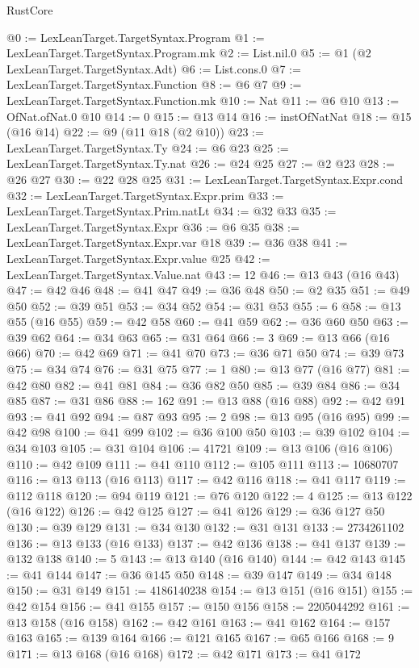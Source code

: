 \begin{lexlean}{RustCore}
\begin{coremodule}
@0 := LexLeanTarget.TargetSyntax.Program
@1 := LexLeanTarget.TargetSyntax.Program.mk
@2 := List.nil.{0}
@5 := @1 (@2 LexLeanTarget.TargetSyntax.Adt)
@6 := List.cons.{0}
@7 := LexLeanTarget.TargetSyntax.Function
@8 := @6 @7
@9 := LexLeanTarget.TargetSyntax.Function.mk
@10 := Nat
@11 := @6 @10
@13 := OfNat.ofNat.{0} @10
@14 := 0
@15 := @13 @14
@16 := instOfNatNat
@18 := @15 (@16 @14)
@22 := @9 (@11 @18 (@2 @10))
@23 := LexLeanTarget.TargetSyntax.Ty
@24 := @6 @23
@25 := LexLeanTarget.TargetSyntax.Ty.nat
@26 := @24 @25
@27 := @2 @23
@28 := @26 @27
@30 := @22 @28 @25
@31 := LexLeanTarget.TargetSyntax.Expr.cond
@32 := LexLeanTarget.TargetSyntax.Expr.prim
@33 := LexLeanTarget.TargetSyntax.Prim.natLt
@34 := @32 @33
@35 := LexLeanTarget.TargetSyntax.Expr
@36 := @6 @35
@38 := LexLeanTarget.TargetSyntax.Expr.var @18
@39 := @36 @38
@41 := LexLeanTarget.TargetSyntax.Expr.value @25
@42 := LexLeanTarget.TargetSyntax.Value.nat
@43 := 12
@46 := @13 @43 (@16 @43)
@47 := @42 @46
@48 := @41 @47
@49 := @36 @48
@50 := @2 @35
@51 := @49 @50
@52 := @39 @51
@53 := @34 @52
@54 := @31 @53
@55 := 6
@58 := @13 @55 (@16 @55)
@59 := @42 @58
@60 := @41 @59
@62 := @36 @60 @50
@63 := @39 @62
@64 := @34 @63
@65 := @31 @64
@66 := 3
@69 := @13 @66 (@16 @66)
@70 := @42 @69
@71 := @41 @70
@73 := @36 @71 @50
@74 := @39 @73
@75 := @34 @74
@76 := @31 @75
@77 := 1
@80 := @13 @77 (@16 @77)
@81 := @42 @80
@82 := @41 @81
@84 := @36 @82 @50
@85 := @39 @84
@86 := @34 @85
@87 := @31 @86
@88 := 162
@91 := @13 @88 (@16 @88)
@92 := @42 @91
@93 := @41 @92
@94 := @87 @93
@95 := 2
@98 := @13 @95 (@16 @95)
@99 := @42 @98
@100 := @41 @99
@102 := @36 @100 @50
@103 := @39 @102
@104 := @34 @103
@105 := @31 @104
@106 := 41721
@109 := @13 @106 (@16 @106)
@110 := @42 @109
@111 := @41 @110
@112 := @105 @111
@113 := 10680707
@116 := @13 @113 (@16 @113)
@117 := @42 @116
@118 := @41 @117
@119 := @112 @118
@120 := @94 @119
@121 := @76 @120
@122 := 4
@125 := @13 @122 (@16 @122)
@126 := @42 @125
@127 := @41 @126
@129 := @36 @127 @50
@130 := @39 @129
@131 := @34 @130
@132 := @31 @131
@133 := 2734261102
@136 := @13 @133 (@16 @133)
@137 := @42 @136
@138 := @41 @137
@139 := @132 @138
@140 := 5
@143 := @13 @140 (@16 @140)
@144 := @42 @143
@145 := @41 @144
@147 := @36 @145 @50
@148 := @39 @147
@149 := @34 @148
@150 := @31 @149
@151 := 4186140238
@154 := @13 @151 (@16 @151)
@155 := @42 @154
@156 := @41 @155
@157 := @150 @156
@158 := 2205044292
@161 := @13 @158 (@16 @158)
@162 := @42 @161
@163 := @41 @162
@164 := @157 @163
@165 := @139 @164
@166 := @121 @165
@167 := @65 @166
@168 := 9
@171 := @13 @168 (@16 @168)
@172 := @42 @171
@173 := @41 @172

\end{coremodule}
\end{lexlean}
